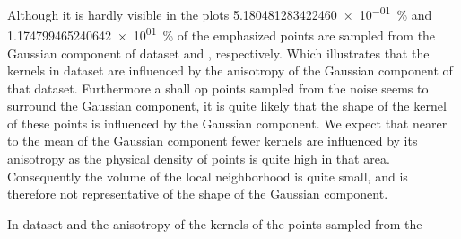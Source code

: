 				Although it is hardly visible in the plots \SI{5.180481283422460e-01}{\percent} and \SI{1.174799465240642e+01}{\percent} of the emphasized points are sampled from the Gaussian component of dataset \ferdosiOne and \baakmanOne, respectively. Which illustrates that the kernels in dataset \baakmanOne are influenced by the anisotropy of the Gaussian component of that dataset.
				Furthermore a shall op points sampled from the noise seems to surround the Gaussian component, it is quite likely that the shape of the kernel of these points is influenced by the Gaussian component. 
				We expect that nearer to the mean of the Gaussian component fewer kernels are influenced by its anisotropy as the physical density of points is quite high in that area. Consequently the volume of the local neighborhood is quite small, and is therefore not representative of the shape of the Gaussian component. 

			In dataset \baakmanFour and \baakmanFive the anisotropy of the kernels of the points sampled from the


		







